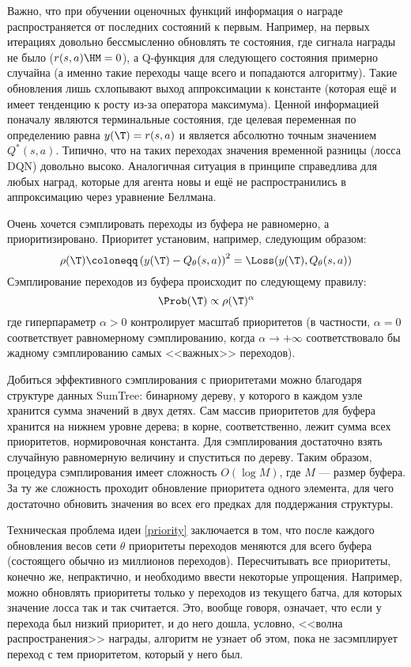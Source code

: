 Важно, что при обучении оценочных функций информация о награде распространяется от последних состояний к первым. Например, на первых итерациях довольно бессмысленно обновлять те состояния, где сигнала награды не было ($r(s, a) \HM= 0$), а Q-функция для следующего состояния примерно случайна (а именно такие переходы чаще всего и попадаются алгоритму). Такие обновления лишь схлопывают выход аппроксимации к константе (которая ещё и имеет тенденцию к росту из-за оператора максимума). Ценной информацией поначалу являются терминальные состояния, где целевая переменная по определению равна $y(\T ) = r(s, a)$ и является абсолютно точным значением $Q^*(s, a)$. Типично, что на таких переходах значения временной разницы (лосса DQN) довольно высоко. Аналогичная ситуация в принципе справедлива для любых наград, которые для агента новы и ещё не распространились в аппроксимацию через уравнение Беллмана.

Очень хочется сэмплировать переходы из буфера не равномерно, а приоритизировано. Приоритет установим, например, следующим образом:
\begin{equation}\label{priority}
    \rho(\T ) \coloneqq \left( y(\T ) - Q_{\theta}(s, a) \right)^2 = \Loss(y(\T ), Q_{\theta}(s, a))
\end{equation}
Сэмплирование переходов из буфера происходит по следующему правилу:
$$\Prob ( \T ) \propto \rho( \T )^\alpha$$
где гиперпараметр $\alpha > 0$ контролирует масштаб приоритетов (в частности, $\alpha = 0$ соответствует равномерному сэмплированию, когда $\alpha \to +\infty$ соответствовало бы жадному сэмплированию самых <<важных>> переходов).

\begin{remark}
Добиться эффективного сэмплирования с приоритетами можно благодаря структуре данных SumTree: бинарному дереву, у которого в каждом узле хранится сумма значений в двух детях. Сам массив приоритетов для буфера хранится на нижнем уровне дерева; в корне, соответственно, лежит сумма всех приоритетов, нормировочная константа. Для сэмплирования достаточно взять случайную равномерную величину и спуститься по дереву. Таким образом, процедура сэмплирования имеет сложность $O(\log M)$, где $M$ --- размер буфера. За ту же сложность проходит обновление приоритета одного элемента, для чего достаточно обновить значения во всех его предках для поддержания структуры.
\end{remark}

Техническая проблема идеи \eqref{priority} заключается в том, что после каждого обновления весов сети $\theta$ приоритеты переходов меняются для всего буфера (состоящего обычно из миллионов переходов). Пересчитывать все приоритеты, конечно же, непрактично, и необходимо ввести некоторые упрощения. Например, можно обновлять приоритеты только у переходов из текущего батча, для которых значение лосса так и так считается. Это, вообще говоря, означает, что если у перехода был низкий приоритет, и до него дошла, условно, <<волна распространения>> награды, алгоритм не узнает об этом, пока не засэмплирует переход с тем приоритетом, который у него был.

